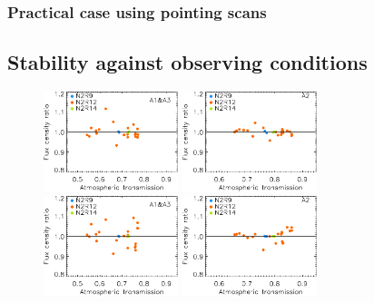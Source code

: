\subsubsection{Practical case using pointing scans}
\label{se:photocorr_pointing}





\subsection{Stability against observing conditions}


\begin{figure}[ht!]
\begin{center}
  \includegraphics[clip=true, trim={0, -0.3cm, -0.3cm, 0}, width=0.35\textwidth]{Figures/Calibration/plot_flux_density_ratio_obstau_uranus_corrected_skydip_narrow_1mm.pdf}
  \includegraphics[clip=true, trim={0, -0.3cm, -0.3cm, 0}, width=0.35\textwidth]{Figures/Calibration/plot_flux_density_ratio_obstau_uranus_corrected_skydip_narrow_a2.pdf}
  \includegraphics[clip=true, trim={0, -0.3cm, -0.3cm, 0}, width=0.35\textwidth]{Figures/Calibration/plot_flux_density_ratio_obstau_uranus_tau225_narrow_1mm.pdf}
  \includegraphics[clip=true, trim={0, -0.3cm, -0.3cm, 0}, width=0.35\textwidth]{Figures/Calibration/plot_flux_density_ratio_obstau_uranus_tau225_narrow_a2.pdf}

\end{center}
\end{figure}
